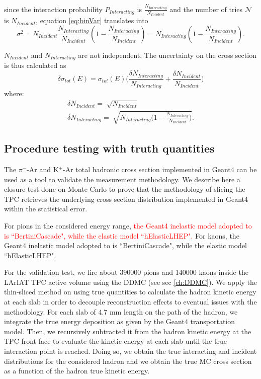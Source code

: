 since the interaction probability $P_{Interacting}$ is $\frac{ N_{Interacting}}{N_{Incident}}$ and the number of tries $\mathcal{N}$ is $N_{Incident}$, equation \ref{eq:binVar} translates into
\begin{equation}
\sigma^2 = N_{Incident}\frac{ N_{Interacting}}{N_{Incident}} (1-\frac{ N_{Interacting}}{N_{Incident}}) = N_{Interacting}(1-\frac{ N_{Interacting}}{N_{Incident}}).
\end{equation}

$N_{Incident}$ and $N_{Interacting}$ are not independent.
The uncertainty on the cross section is thus calculated as 
\begin{equation}
\delta\sigma_{tot}(E) = \sigma_{tot}(E) \Big(\frac{\delta N_{Interacting}}{N_{Interacting}}+\frac{\delta N_{Incident}}{N_{Incident}}\Big) 
\end{equation}
where:
\begin{eqnarray}
\delta N_{Incident} = \sqrt[]{N_{Incident}} \\
\delta N_{Interacting} = \sqrt[]{N_{Interacting}\Big(1-\frac{ N_{Interacting}}{N_{Incident}}\Big)}.
\end{eqnarray}





\subsection{Procedure testing with truth quantities}\label{ch:procedureTesting}
The $\pi^{-}$-Ar and K$^{+}$-Ar total hadronic cross section implemented in Geant4 can be used as a tool to validate the measurement methodology.  We describe here a closure test done on Monte Carlo to prove that the methodology of slicing the TPC retrieves the underlying cross section distribution implemented in Geant4 within the statistical error. %

For pions in the considered energy range, \textcolor{red}{the Geant4 inelastic model adopted to is ``BertiniCascade", while the elastic model ``hElasticLHEP".}
For kaons, the Geant4 inelastic model adopted to is ``BertiniCascade", while the elastic model ``hElasticLHEP".  


For the validation test, we fire about 390000 pions and 140000 kaons inside the LArIAT TPC active volume using the DDMC (see sec \ref{ch:DDMC}). We apply  the thin-sliced method on using true quantities to calculate the hadron kinetic energy at each slab in order to decouple reconstruction effects to eventual issues with the methodology.  For each slab of 4.7 mm length on the path of the hadron, we integrate the true energy deposition as given by the Geant4 transportation model. Then, we recursively subtracted it from the hadron kinetic energy at the TPC front face to evaluate the kinetic energy at each slab until the true interaction point is reached. Doing so, we obtain the true interacting and incident distributions for the considered hadron and we obtain the true MC cross section as a function of the hadron true kinetic energy. 

